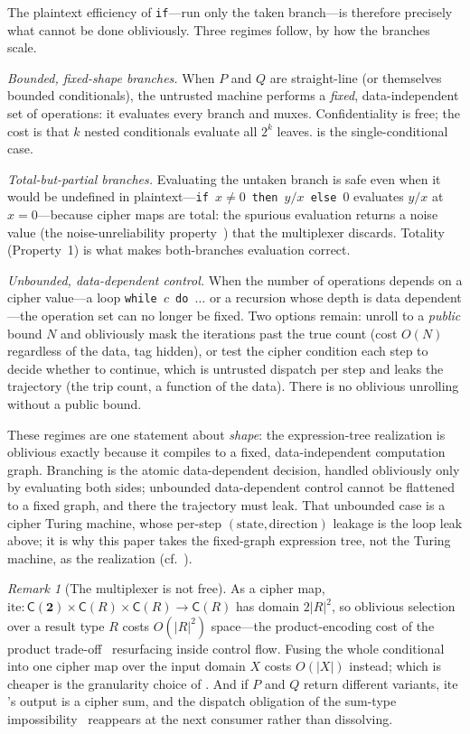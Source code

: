 \documentclass[11pt]{article}
\theoremstyle{definition}
\theoremstyle{plain}
\theoremstyle{remark}
\newtheorem{remark}{Remark}[section]
\newcommand{\cipher}[1]{\mathsf{C}(#1)}
\begin{document}
The plaintext efficiency of \texttt{if}---run only the taken branch---is
therefore precisely what cannot be done obliviously.
Three regimes follow, by how the branches scale.

\emph{Bounded, fixed-shape branches.}
When $P$ and $Q$ are straight-line (or themselves bounded conditionals),
the untrusted machine performs a \emph{fixed}, data-independent set of
operations: it evaluates every branch and muxes.
Confidentiality is free; the cost is that $k$ nested conditionals
evaluate all $2^k$ leaves.
 is the single-conditional case.

\emph{Total-but-partial branches.}
Evaluating the untaken branch is safe even when it would be undefined in
plaintext---\texttt{if $x \neq 0$ then $y/x$ else $0$} evaluates $y/x$ at
$x=0$---because cipher maps are total: the spurious evaluation returns a
noise value (the noise-unreliability property~\cite{towell2026algebraic}) that the multiplexer
discards.
Totality (Property~1) is what makes both-branches evaluation correct.

\emph{Unbounded, data-dependent control.}
When the number of operations depends on a cipher value---a loop
\texttt{while $c$ do $\ldots$} or a recursion whose depth is data
dependent---the operation set can no longer be fixed.
Two options remain: unroll to a \emph{public} bound $N$ and obliviously
mask the iterations past the true count (cost $O(N)$ regardless of the
data, tag hidden), or test the cipher condition each step to decide
whether to continue, which is untrusted dispatch per step and leaks the
trajectory (the trip count, a function of the data).
There is no oblivious unrolling without a public bound.

These regimes are one statement about \emph{shape}: the expression-tree
realization is oblivious exactly because it compiles to a fixed,
data-independent computation graph.
Branching is the atomic data-dependent decision, handled obliviously
only by evaluating both sides; unbounded data-dependent control cannot
be flattened to a fixed graph, and there the trajectory must leak.
That unbounded case is a cipher Turing machine, whose per-step
$(\text{state}, \text{direction})$ leakage is the loop leak above; it is
why this paper takes the fixed-graph expression tree, not the Turing
machine, as the realization (cf.\ ).

\begin{remark}[The multiplexer is not free]
\label{rem:mux-cost}
As a cipher map, $\mathrm{ite} : \cipher{\mathbf 2} \times \cipher{R}
\times \cipher{R} \to \cipher{R}$ has domain $2|R|^2$, so oblivious
selection over a result type $R$ costs $O(|R|^2)$ space---the
product-encoding cost of the product trade-off~\cite{towell2026algebraic} resurfacing inside
control flow.
Fusing the whole conditional into one cipher map over the input domain
$X$ costs $O(|X|)$ instead; which is cheaper is the granularity choice of
.
And if $P$ and $Q$ return different variants, $\mathrm{ite}$'s output is
a cipher sum, and the dispatch obligation of the sum-type impossibility~\cite{towell2026algebraic}
reappears at the next consumer rather than dissolving.
\end{remark}
\end{document}
